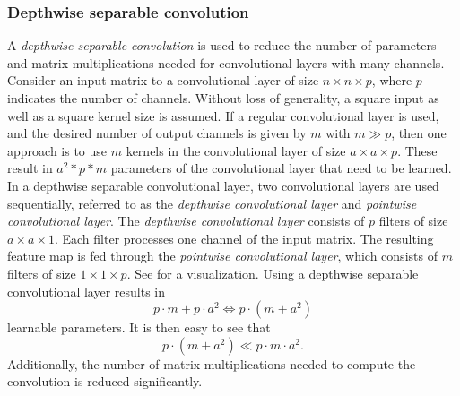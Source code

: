 \subsubsection{Depthwise separable convolution}
A \textit{depthwise separable convolution} \cite{sifre_rigid-motion_2014} \cite{chollet_xception:_2017} is used to reduce the number of parameters and matrix multiplications needed for convolutional layers with many channels.
Consider an input matrix to a convolutional layer of size $n \times n \times p$, where $p$ indicates the number of channels.
Without loss of generality, a square input as well as a square kernel size is assumed.
If a regular convolutional layer is used, and the desired number of output channels is given by $m$ with $m \gg p$, then one approach is to use $m$ kernels in the convolutional layer of size $a \times a \times p$.
These result in $a^2 * p * m$ parameters of the convolutional layer that need to be learned.
In a depthwise separable convolutional layer, two convolutional layers are used sequentially, referred to as the \textit{depthwise convolutional layer} and \textit{pointwise convolutional layer}.
The \textit{depthwise convolutional layer} consists of $p$ filters of size $a \times a \times 1$.
Each filter processes one channel of the input matrix.
The resulting feature map is fed through the \textit{pointwise convolutional layer}, which consists of $m$ filters of size $1 \times 1 \times p$.
See  for a visualization.
Using a depthwise separable convolutional layer results in $$p \cdot m + p \cdot a^2 \Leftrightarrow p \cdot (m + a^2)$$ learnable parameters.
It is then easy to see that $$p \cdot (m + a^2) \ll p \cdot m \cdot a^2.$$
Additionally, the number of matrix multiplications needed to compute the convolution is reduced significantly.

